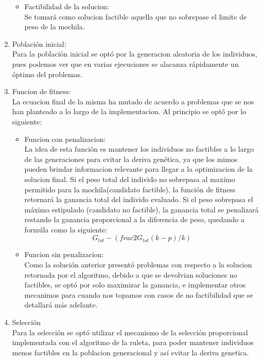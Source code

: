 \documentclass[9pt,conference]{IEEEtran}
\begin{document}
\begin{enumerate}
\begin{itemize}
		\item Factibilidad de la solucion:\\ Se tomará como solucion factible aquella que no sobrepase el limite de peso de la mochila.
		\end{itemize}	
			
	\item Población inicial:\\
		Para la población inicial se optó por la generacion aleatoria de los individuos, pues podemos ver que en varias ejecuciones se alacanza rápidamente un óptimo del problemas.
		
	\item Funcion de fitness:\\
			La ecuacion final de la misma ha mutado de acuerdo a problemas que se nos han planteado a lo largo de la implementacion. Al principio se optó por lo siguiente:	
		\begin{itemize}	
			\item Funcion con penalizacion:\\
			La idea de esta función es mantener los individuos no factibles a lo largo de las generaciones para evitar la deriva genética, ya que los mimos pueden brindar informacion relevante para llegar a la optimizacion de la solucion final.
			Si el peso total del individo no sobrepasa al maxímo permitido para la mochila(candidato factible), la función de fitness retornará la ganancia total del individo evaluado.
			Si el peso sobrepasa el máximo estipulado (candidato no factible), la ganancia total se penalizará restando la ganancia proporcional a la diferencia de peso, quedando a formúla como la siguiente:
				\[ G_{tot}-(frac{2 G_{tot} (k-p)}/k) \]
			\item Funcion sin penalizacion:\\
				Como la solución anterior presentó problemas con respecto a la solucion retornada por el algoritmo, debido a que se devolvian soluciones no factibles, se optó por solo maximizar la ganancia, e implementar otros mecanimos para cuando nos topamos con casos de no factibilidad que se detallará más adelante.
		\end{itemize}	
		
	\item Selección\\
		Para la selección se optó utilizar el mecanismo de la selección proporcional implementada con el algoritmo de la ruleta, para poder mantener individuos menos factibles en la poblacion generacional y así evitar la deriva genetica.
		

\end{enumerate}
\end{document}
